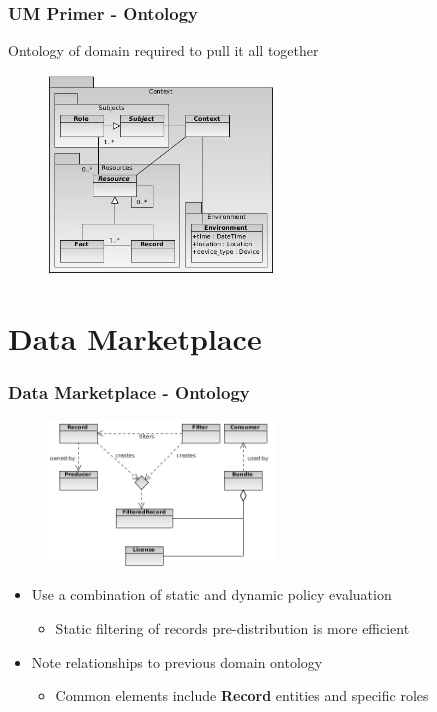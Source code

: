 \documentclass[t, 10pt]{beamer}
\begin{document}
\begin{frame}
\frametitle{UM Primer - Ontology}

Ontology of domain required to pull it all together
\begin{figure}
\includegraphics[width = 6cm]{UMOntology}
\end{figure}

\end{frame}

\section{Data Marketplace}
\begin{frame}
\frametitle{Data Marketplace - Ontology}
\pause

\begin{figure}
\includegraphics[width = 6cm]{ontology}
\end{figure}
\pause

\begin{itemize}
\item Use a combination of static and dynamic policy evaluation
\begin{itemize}
\item Static filtering of records pre-distribution is more efficient
\end{itemize}
\pause

\item Note relationships to previous domain ontology
\begin{itemize}
\item Common elements include \textbf{Record} entities and specific roles
\end{itemize}
\end{itemize}

\end{frame}
\end{document}
